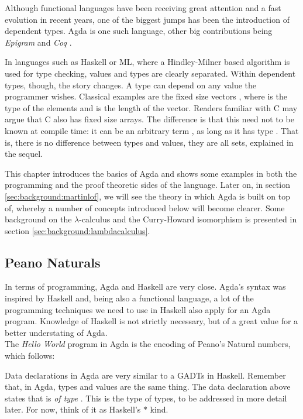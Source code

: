 Although functional languages have been receiving great attention
and a fast evolution in recent years, one of the biggest jumps
has been the introduction of dependent types. Agda\cite{norell07} is one such language, other 
big contributions being \emph{Epigram} \cite{mcbride05} and \emph{Coq} \cite{bertot06}. 

In languages such as Haskell or ML, where a Hindley-Milner based algorithm is used
for type checking, values and types are clearly separated. Within dependent
types, though, the story changes. A type can depend on any value the programmer
wishes. Classical examples are the fixed size vectors , where 
is the type of the elements and  is the length of the vector. Readers familiar
with C may argue that C also has fixed size arrays. The difference is that
this  need not to be known at compile time: it can be an arbitrary term , as long as it has type . That is, there is no difference between types and values, they are all sets, explained in the sequel.

This chapter introduces the basics of Agda and shows some examples in both
the programming and the proof theoretic sides of the language. Later on, in 
section \ref{sec:background:martinlof}, we will see the theory in which Agda is built 
on top of, whereby a number of concepts introduced below will become clearer. 
Some background on the $\lambda$-calculus and the Curry-Howard isomorphism is
presented in section \ref{sec:background:lambdacalculus}.

\subsection{Peano Naturals}

In terms of programming, Agda and Haskell are very close. Agda's syntax was
inspired by Haskell and, being also a functional language, a lot of
the programming techniques we need to use in Haskell also apply for an Agda program.
Knowledge of Haskell is not strictly necessary, but of a great value for a better
understating of Agda.\\

The \emph{Hello World} program in Agda is the encoding of Peano's Natural numbers, which follows:


Data declarations in Agda are very similar to a GADTs\cite{Xi2003} in Haskell. Remember that, in Agda, types and values are the same thing.
The data declaration above states that  is \emph{of type} 
. This  is the type of types, to be addressed in more detail later. 
For now, think of it as Haskell's $*$ kind.


